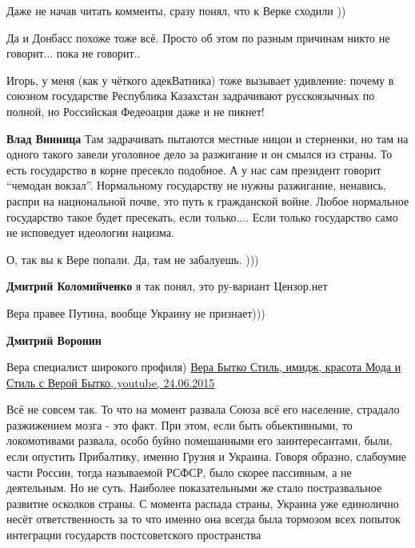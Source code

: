 \begin{itemize}
Даже не начав читать комменты, сразу понял, что к Верке сходили ))

Да и Донбасс похоже тоже всё. Просто об этом по разным причинам никто не говорит... пока не говорит..


Игорь, у меня (как у чёткого адекВатника) тоже вызывает удивление: почему в
союзном государстве Республика Казахстан задрачивают русскоязычных по полной,
но Российская Федеоация даже и не пикнет!

\begin{itemize} %
\textbf{Влад Винница} Там задрачивать пытаются местные ницои и стерненки, но там на одного такого завели уголовное дело за разжигание и он смылся из страны.
То есть государство в корне пресекло подобное.
А у нас сам президент говорит \enquote{чемодан вокзал}.
Нормальному государству не нужны разжигание, ненавись, распри на национальной почве, это путь к гражданской войне. Любое нормальное государство такое будет пресекать, если только....
Если только государство само не исповедует идеологии нацизма.
\end{itemize} %


О, так вы к Вере попали. Да, там не забалуешь. )))

\begin{itemize} %
\textbf{Дмитрий Коломийченко} я так понял, это ру-вариант Цензор.нет

Вера правее Путина, вообще Украину не признает)))

\textbf{Дмитрий Воронин} 

Вера специалист широкого профиля) \href{https://youtu.be/dm6KKMRG_QI}{%
Вера Бытко Стиль, имидж, красота Мода и Стиль с Верой Бытко, youtube, 24.06.2015%
}

\end{itemize} %


Всё не совсем так. То что на момент развала Союза всё его население, страдало
разжижением мозга - это факт. При этом, если быть обьективными, то
локомотивами развала, особо буйно помешанными его заинтересантами, были, если
опустить Прибалтику, именно Грузия и Украина. Говоря образно, слабоумие части
России, тогда называемой РСФСР, было скорее пассивным, а не деятельным. Но не
суть. Наиболее показательными же стало постразвальное развитие осколков страны.
С момента распада страны, Украина уже единолично несёт ответственность за то
что именно она всегда была тормозом всех попыток интеграции государств
постсоветского пространства



\end{itemize}
